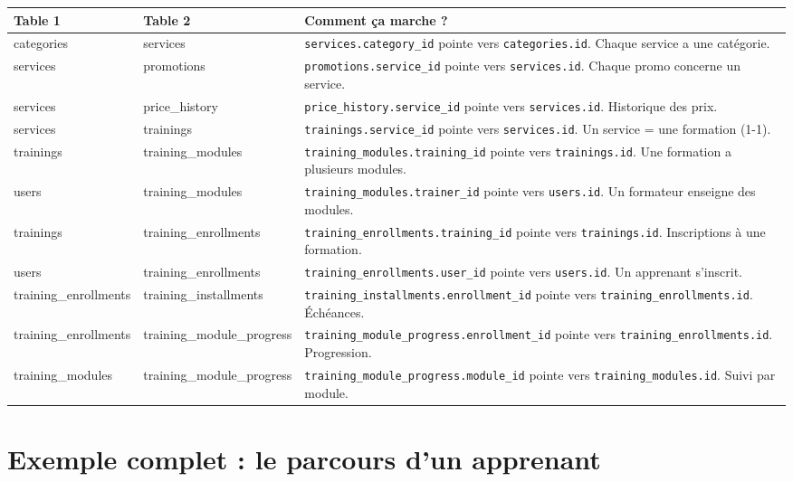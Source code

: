 \documentclass[12pt,a4paper]{article}
\begin{document}
\noindent\begin{tabularx}{\textwidth}{l l X}
    \toprule
    \textbf{Table 1} & \textbf{Table 2} & \textbf{Comment ça marche ?} \\
    \midrule
    categories & services & \texttt{services.category\_id} pointe vers \texttt{categories.id}. Chaque service a une catégorie. \\
    services & promotions & \texttt{promotions.service\_id} pointe vers \texttt{services.id}. Chaque promo concerne un service. \\
    services & price\_history & \texttt{price\_history.service\_id} pointe vers \texttt{services.id}. Historique des prix. \\
    services & trainings & \texttt{trainings.service\_id} pointe vers \texttt{services.id}. Un service = une formation (1-1). \\
    trainings & training\_modules & \texttt{training\_modules.training\_id} pointe vers \texttt{trainings.id}. Une formation a plusieurs modules. \\
    users & training\_modules & \texttt{training\_modules.trainer\_id} pointe vers \texttt{users.id}. Un formateur enseigne des modules. \\
    trainings & training\_enrollments & \texttt{training\_enrollments.training\_id} pointe vers \texttt{trainings.id}. Inscriptions à une formation. \\
    users & training\_enrollments & \texttt{training\_enrollments.user\_id} pointe vers \texttt{users.id}. Un apprenant s'inscrit. \\
    training\_enrollments & training\_installments & \texttt{training\_installments.enrollment\_id} pointe vers \texttt{training\_enrollments.id}. Échéances. \\
    training\_enrollments & training\_module\_progress & \texttt{training\_module\_progress.enrollment\_id} pointe vers \texttt{training\_enrollments.id}. Progression. \\
    training\_modules & training\_module\_progress & \texttt{training\_module\_progress.module\_id} pointe vers \texttt{training\_modules.id}. Suivi par module. \\
    \bottomrule
\end{tabularx}

\section{Exemple complet : le parcours d'un apprenant}
\end{document}
